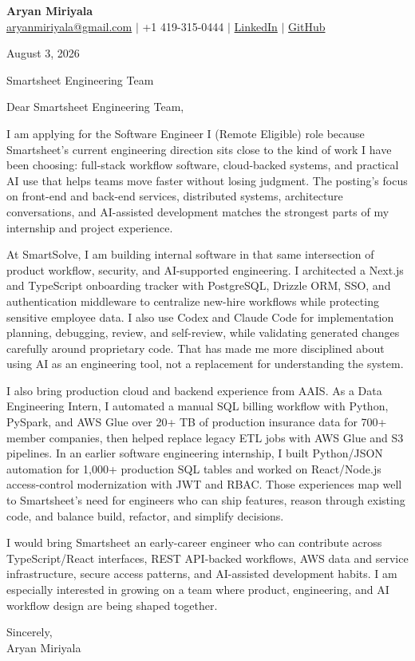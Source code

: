 \documentclass[letterpaper,11pt]{article}
\begin{document}
{\Large\textbf{Aryan Miriyala}}\\
\href{mailto:aryanmiriyala@gmail.com}{aryanmiriyala@gmail.com} $|$ +1 419-315-0444 $|$
\href{https://www.linkedin.com/in/aryan-miriyala-7788a21b6/}{LinkedIn} $|$
\href{https://github.com/aryanmiriyala}{GitHub}

August 3, 2026

Smartsheet Engineering Team

Dear Smartsheet Engineering Team,

I am applying for the Software Engineer I (Remote Eligible) role because Smartsheet's current engineering direction sits close to the kind of work I have been choosing: full-stack workflow software, cloud-backed systems, and practical AI use that helps teams move faster without losing judgment. The posting's focus on front-end and back-end services, distributed systems, architecture conversations, and AI-assisted development matches the strongest parts of my internship and project experience.

At SmartSolve, I am building internal software in that same intersection of product workflow, security, and AI-supported engineering. I architected a Next.js and TypeScript onboarding tracker with PostgreSQL, Drizzle ORM, SSO, and authentication middleware to centralize new-hire workflows while protecting sensitive employee data. I also use Codex and Claude Code for implementation planning, debugging, review, and self-review, while validating generated changes carefully around proprietary code. That has made me more disciplined about using AI as an engineering tool, not a replacement for understanding the system.

I also bring production cloud and backend experience from AAIS. As a Data Engineering Intern, I automated a manual SQL billing workflow with Python, PySpark, and AWS Glue over 20+ TB of production insurance data for 700+ member companies, then helped replace legacy ETL jobs with AWS Glue and S3 pipelines. In an earlier software engineering internship, I built Python/JSON automation for 1,000+ production SQL tables and worked on React/Node.js access-control modernization with JWT and RBAC. Those experiences map well to Smartsheet's need for engineers who can ship features, reason through existing code, and balance build, refactor, and simplify decisions.

I would bring Smartsheet an early-career engineer who can contribute across TypeScript/React interfaces, REST API-backed workflows, AWS data and service infrastructure, secure access patterns, and AI-assisted development habits. I am especially interested in growing on a team where product, engineering, and AI workflow design are being shaped together.

Sincerely,\\
Aryan Miriyala
\end{document}

